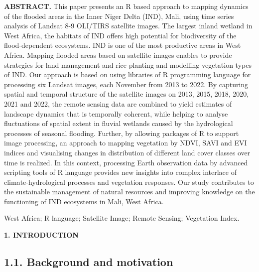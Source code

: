\documentclass[12pt,a4paper,oneside]{article}
\def \newsection{\vspace{12pt}\textbf}
\def \newpar{\vspace{6pt}}
\begin{document}
{\bf ABSTRACT.} This paper presents an R based approach to mapping dynamics of the flooded areas in the Inner Niger Delta (IND), Mali, using time series analysis of Landsat 8-9 OLI/TIRS satellite images. The largest inland wetland in West Africa, the habitats of IND offers high potential for biodiversity of the flood-dependent ecosystems. IND is one of the most productive areas in West Africa. Mapping flooded areas based on satellite images enables to provide strategies for land management and rice planting and modelling vegetation types of IND. Our approach is based on using libraries of R programming language for processing six Landsat images, each November from 2013 to 2022. By capturing spatial and temporal structure of the satellite images on 2013, 2015, 2018, 2020, 2021 and 2022, the remote sensing data are combined to yield estimates of landscape dynamics that is temporally coherent, while helping to analyse fluctuations of spatial extent in fluvial wetlands caused by the hydrological processes of seasonal flooding. Further, by allowing packages of R to support image processing, an approach to mapping vegetation by NDVI, SAVI and EVI indices and visualising changes in distribution of different land cover classes over time is realized. In this context, processing Earth observation data by advanced scripting tools of R language provides new insights into complex interlace of climate-hydrological processes and vegetation responses. Our study contributes to the sustainable management of natural resources and improving knowledge on the functioning of IND ecosystems in Mali, West Africa. 

\newpar {\bf Keywords:} West Africa; R language; Satellite Image; Remote Sensing; Vegetation Index.


\newsection {1. INTRODUCTION}

\subsection*{1.1. Background and motivation}
\end{document}
